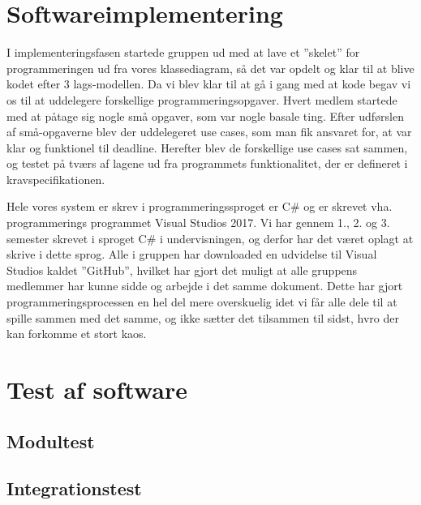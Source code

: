 \section{Softwareimplementering}
I implementeringsfasen startede gruppen ud med at lave et ”skelet” for programmeringen ud fra vores klassediagram, så det var opdelt og klar til at blive kodet efter 3 lags-modellen. Da vi blev klar til at gå i gang med at kode begav vi os til at uddelegere forskellige programmeringsopgaver. Hvert medlem startede med at påtage sig nogle små opgaver, som var nogle basale ting. Efter udførslen af små-opgaverne blev der uddelegeret use cases, som man fik ansvaret for, at var klar og funktionel til deadline. Herefter blev de forskellige use cases sat sammen, og testet på tværs af lagene ud fra programmets funktionalitet, der er defineret i kravspecifikationen. 

Hele vores system er skrev i programmeringssproget er C# og er skrevet vha. programmerings programmet Visual Studios 2017.  Vi har gennem 1., 2. og 3. semester skrevet i sproget C# i undervisningen, og derfor har det været oplagt at skrive i dette sprog. Alle i gruppen har downloaded en udvidelse til Visual Studios kaldet ”GitHub”, hvilket har gjort det muligt at alle gruppens medlemmer har kunne sidde og arbejde i det samme dokument. Dette har gjort programmeringsprocessen en hel del mere overskuelig idet vi får alle dele til at spille sammen med det samme, og ikke sætter det tilsammen til sidst, hvro der kan forkomme et stort kaos. 
\section{Test af software}
\subsection{Modultest}
\subsection{Integrationstest}
